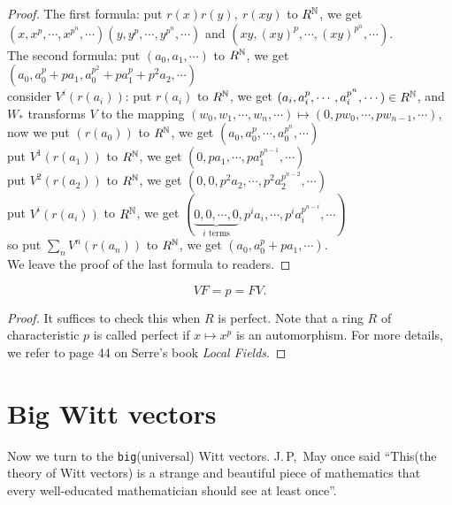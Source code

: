 \begin{proof}
The first formula: put $r(x)r(y),\ r(xy)$ to $R^{\mathbb{N}}$, we get $(x,x^p,\cdots,x^{p^n},\cdots)(y,y^p,\cdots,y^{p^n},\cdots)$ and $(xy,(xy)^p,\cdots,(xy)^{p^n},\cdots)$.\\
The second formula: put $(a_0,a_1,\cdots)$ to $R^{\mathbb{N}}$, we get $(a_0,a_0^p+pa_1,a_0^{p^2}+pa_1^p+p^2a_2,\cdots)$\\
consider $V^i(r(a_i))$: put $r(a_i)$ to $R^{\mathbb{N}}$, we get $(a_i,a_i^p,\cdots,a_i^{p^n},\cdots)\in R^{\mathbb{N}}$, and $W_*$ transforms $V$ to the mapping $(w_0,w_1,\cdots,w_n,\cdots)\mapsto (0,pw_0,\cdots,pw_{n-1},\cdots)$, \\
now we put $(r(a_0))$ to $R^{\mathbb{N}}$, we get $(a_0,a_0^p,\cdots,a_0^{p^n},\cdots)$\\
put $V^1(r(a_1))$ to $R^{\mathbb{N}}$, we get $(0,pa_1,\cdots,pa_1^{p^{n-1}},\cdots)$\\
put $V^2(r(a_2))$ to $R^{\mathbb{N}}$, we get $(0,0,p^2a_2,\cdots,p^2a_2^{p^{n-2}},\cdots)$\\
put $V^i(r(a_i))$ to $R^{\mathbb{N}}$, we get $(\underbrace{0,0,\cdots,0}_{i\mbox{ terms}},p^ia_i,\cdots,p^ia_i^{p^{n-i}},\cdots)$\\
so put $\sum_n V^n(r(a_n))$ to $R^{\mathbb{N}}$, we get $(a_0,a_0^p+pa_1,\cdots)$.\\
We leave the proof of the last formula to readers.
\end{proof}
\begin{prop}
	\[VF=p=FV.\]
\end{prop}
\begin{proof}
It suffices to check this when $R$ is perfect. Note that a ring $R$ of characteristic $p$ is called perfect if $x\mapsto x^p$ is an automorphism. For more details, we refer to page 44 on Serre's book {\em Local Fields}.
\end{proof}

\section{Big Witt vectors} %
\label{sec:big_witt_vectors}
Now we turn to the \texttt{big}(universal) Witt vectors. J.\,P,\ May once said ``This(the theory of Witt vectors) is a strange and beautiful piece of mathematics that every well-educated mathematician should see at least once''.

